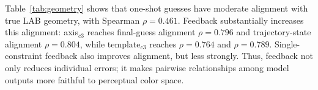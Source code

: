 \documentclass[11pt]{article}
\begin{document}
Table~\ref{tab:geometry} shows that one-shot guesses have moderate alignment
with true LAB geometry, with Spearman $\rho=0.461$. Feedback substantially
increases this alignment: axis$_{c3}$ reaches final-guess alignment
$\rho=0.796$ and trajectory-state alignment $\rho=0.804$, while
template$_{c3}$ reaches $\rho=0.764$ and $\rho=0.789$. Single-constraint
feedback also improves alignment, but less strongly. Thus, feedback not only
reduces individual errors; it makes pairwise relationships among model
outputs more faithful to perceptual color space.




\end{document}
